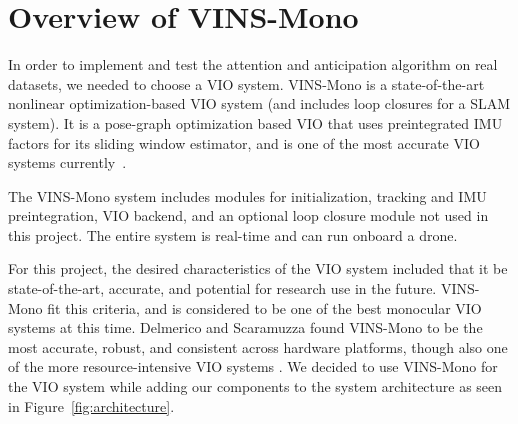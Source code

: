 
\section{Overview of VINS-Mono}\label{sec:vinsmono}

In order to implement and test the attention and anticipation algorithm on real datasets, we needed to choose a VIO system.
VINS-Mono is a state-of-the-art nonlinear optimization-based VIO system (and includes loop closures for a SLAM system).
It is a pose-graph optimization based VIO that uses preintegrated IMU factors for its sliding window estimator, and is one of the most accurate VIO systems currently~\cite{Delmerico2018}.

The VINS-Mono system includes modules for initialization, tracking and IMU preintegration, VIO backend, and an optional loop closure module not used in this project.
The entire system is real-time and can run onboard a drone.

For this project, the desired characteristics of the VIO system included that it be state-of-the-art, accurate, and potential for research use in the future.
VINS-Mono fit this criteria, and is considered to be one of the best monocular VIO systems at this time.
Delmerico and Scaramuzza found VINS-Mono to be the most accurate, robust, and consistent across hardware platforms, though also one of the more resource-intensive VIO systems \cite{Delmerico2018}.
We decided to use VINS-Mono for the VIO system while adding our components to the system architecture as seen in Figure~\ref{fig:architecture}.

